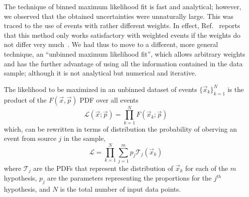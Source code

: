 The technique of binned maximum likelihood fit is fast and analytical; %
however, we observed that the obtained uncertainties were unnaturally large.  This was traced to the use of events with rather different weights. In effect, Ref.~\cite{Barlow1993219} reports that this method only works satisfactory with weighted events if the weights do not differ very much~\cite{Barlow1993219}.
We had thus to move to a different, more general technique, an ``unbinned maximum likelihood fit'',  which allows arbitrary weights and has the further advantage of using all the information contained in the data sample; although it is not analytical but numerical and iterative. 

The likelihood to be maximized in an unbinned dataset of events $\{\vec{x}_k\}^N_{k=1}$ is the product of the $F(\vec{x},\vec{p})$ PDF over all events
%
\begin{equation}
\mathcal{L}(\vec{x};\vec{p}) =\prod^N_{k=1} F(\vec{x}_k;\vec{p})
\end{equation}
%
which, can be rewritten in terms of distribution the probability of oberving an event from source $j$ in the sample,
%
\begin{equation}
\mathcal{L} =  \prod^N_{k=1} \sum^m_{j=1} p_j  \mathcal{T}_j(\vec{x}_k)
 \label{eq:LLgeneral}
\end{equation}
%
where $\mathcal{T}_j$ are the PDFs that represent the distribution of $\vec{x}_k$ for each of the $m$ hypothesis, $p_j$ are the parameters representing the proportions for the $j^{th}$ hypothesis, and $N$ is the total number of input data points.


